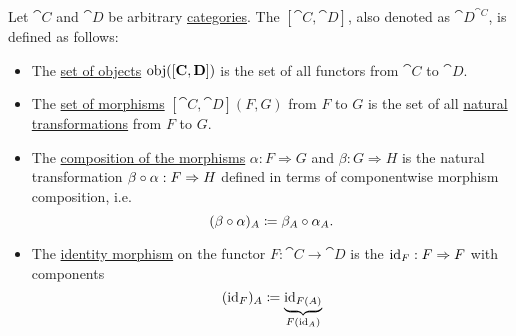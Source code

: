 \begin{definition}\label{def:functor_category}
  Let \( \cat{C} \) and \( \cat{D} \) be arbitrary \hyperref[def:category]{categories}. The  \( [\cat{C}, \cat{D}] \), also denoted as \( \cat{D}^{\cat{C}} \), is defined as follows:

  \begin{itemize}
    \item The \hyperref[def:category/objects]{set of objects} \( \operatorname{obj}([\operatorname{\mathbf{C}}, \operatorname{\mathbf{D}}]) \) is the set of all functors from \( \cat{C} \) to \( \cat{D} \).

    \item The \hyperref[def:category/morphisms]{set of morphisms} \( [\cat{C}, \cat{D}](F, G) \) from \( F \) to \( G \) is the set of all \hyperref[def:natural_transformation]{natural transformations} from \( F \) to \( G \).

    \item The \hyperref[def:category/composition]{composition of the morphisms} \( \alpha: F \Rightarrow G \) and \( \beta: G \Rightarrow H \) is the natural transformation \( \beta \bincirc \alpha: F \Rightarrow H \) defined in terms of componentwise morphism composition, i.e.
    \begin{equation}\label{eq:def:functor_category/composition}
      (\beta \bincirc \alpha)_A \coloneqq \beta_A \bincirc \alpha_A.
    \end{equation}

    \item The \hyperref[def:category/identity]{identity morphism} on the functor \( F: \cat{C} \to \cat{D} \) is the  \( \operatorname{id}_F: F \Rightarrow F \) with components
    \begin{equation}\label{eq:def:functor_category/identity}
      (\operatorname{id}_F)_A \coloneqq \underbrace{\operatorname{id}_{F(A)}}_{F(\operatorname{id}_A)}
    \end{equation}
  \end{itemize}
\end{definition}
